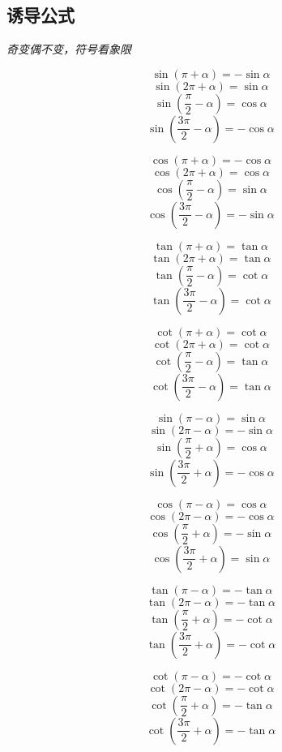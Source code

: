 \documentclass[a4paper, fleqn]{ctexart}
\begin{document}
\begin{multicols}{2}
		\subsection{诱导公式}
		\vspace{2.25ex plus 1ex minus .2ex}
		{\setlength{\parskip}{0ex} \em 奇变偶不变，符号看象限}
		
		\columnbreak
		\begin{multicols}{2}[\setlength{\columnseprule}{0pt}\setlength{\columnseprule}{0pt}]
			
			\[ \sin\left( \pi + \alpha \right) = -\sin\alpha \]
			\[ \sin\left( 2\pi + \alpha \right) = \sin\alpha \]
			\[ \sin\left( \frac\pi2 - \alpha \right) = \cos\alpha \]
			\[ \sin\left( \frac{3\pi}2 - \alpha \right) = -\cos\alpha \]
			
			\[ \cos\left( \pi + \alpha \right) = -\cos\alpha \]
			\[ \cos\left( 2\pi + \alpha \right) = \cos\alpha \]
			\[ \cos\left( \frac\pi2 - \alpha \right) = \sin\alpha \]
			\[ \cos\left( \frac{3\pi}2 - \alpha \right) = -\sin\alpha \]
			
			\[ \tan\left( \pi + \alpha \right) = \tan\alpha \]
			\[ \tan\left( 2\pi + \alpha \right) = \tan\alpha \]
			\[ \tan\left( \frac\pi2 - \alpha \right) = \cot\alpha \]
			\[ \tan\left( \frac{3\pi}2 - \alpha \right) = \cot\alpha \]
			
			\[ \cot\left( \pi + \alpha \right) = \cot\alpha \]
			\[ \cot\left( 2\pi + \alpha \right) = \cot\alpha \]
			\[ \cot\left( \frac\pi2 - \alpha \right) = \tan\alpha \]
			\[ \cot\left( \frac{3\pi}2 - \alpha \right) = \tan\alpha \]
			
			\[ \sin\left( \pi - \alpha \right) = \sin\alpha \]
			\[ \sin\left( 2\pi - \alpha \right) = -\sin\alpha \]
			\[ \sin\left( \frac\pi2 + \alpha \right) = \cos\alpha \]
			\[ \sin\left( \frac{3\pi}2 + \alpha \right) = -\cos\alpha \]
			
			\[ \cos\left( \pi - \alpha \right) = \cos\alpha \]
			\[ \cos\left( 2\pi - \alpha \right) = -\cos\alpha \]
			\[ \cos\left( \frac\pi2 + \alpha \right) = -\sin\alpha \]
			\[ \cos\left( \frac{3\pi}2 + \alpha \right) = \sin\alpha \]
			
			\[ \tan\left( \pi - \alpha \right) = -\tan\alpha \]
			\[ \tan\left( 2\pi - \alpha \right) = -\tan\alpha \]
			\[ \tan\left( \frac\pi2 + \alpha \right) = -\cot\alpha \]
			\[ \tan\left( \frac{3\pi}2 + \alpha \right) = -\cot\alpha \]
			
			\[ \cot\left( \pi - \alpha \right) = -\cot\alpha \]
			\[ \cot\left( 2\pi - \alpha \right) = -\cot\alpha \]
			\[ \cot\left( \frac\pi2 + \alpha \right) = -\tan\alpha \]
			\[ \cot\left( \frac{3\pi}2 + \alpha \right) = -\tan\alpha \]
			

\end{multicols}
\end{multicols}
\end{document}
